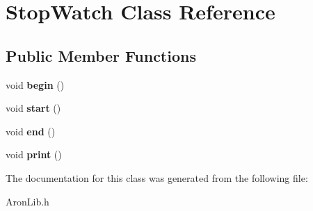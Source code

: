 \hypertarget{class_stop_watch}{}\section{Stop\+Watch Class Reference}
\label{class_stop_watch}
\subsection*{Public Member Functions}
\begin{DoxyCompactItemize}
\item 
\mbox{\label{class_stop_watch_a0fb3ab295580a7d29d55ca52b41f6294}} 
void {\bfseries begin} ()
\item 
\mbox{\label{class_stop_watch_a09a3c8f9ab03d7b28e4f8b90a833974e}} 
void {\bfseries start} ()
\item 
\mbox{\label{class_stop_watch_aea19465133bf92b9abfb7da79940c230}} 
void {\bfseries end} ()
\item 
\mbox{\label{class_stop_watch_a11cecbd5155cbd4076816ce24c43a337}} 
void {\bfseries print} ()
\end{DoxyCompactItemize}


The documentation for this class was generated from the following file\+:\begin{DoxyCompactItemize}
\item 
Aron\+Lib.\+h\end{DoxyCompactItemize}
